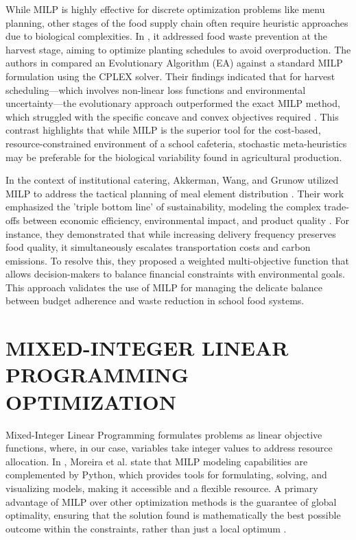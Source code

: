 \documentclass[journal]{IEEEtran}
\begin{document}
While MILP is highly effective for discrete optimization problems like menu planning, other stages of the food supply chain often require heuristic approaches due to biological complexities. In \cite{gunder}, it addressed food waste prevention at the harvest stage, aiming to optimize planting schedules to avoid overproduction. The authors in \cite{gunder} compared an Evolutionary Algorithm (EA) against a standard MILP formulation using the CPLEX solver. Their findings indicated that for harvest scheduling—which involves non-linear loss functions and environmental uncertainty—the evolutionary approach outperformed the exact MILP method, which struggled with the specific concave and convex objectives required \cite{gunder}. This contrast highlights that while MILP is the superior tool for the cost-based, resource-constrained environment of a school cafeteria, stochastic meta-heuristics may be preferable for the biological variability found in agricultural production.

In the context of institutional catering, Akkerman, Wang, and Grunow utilized MILP to address the tactical planning of meal element distribution \cite{akkerman}. Their work emphasized the 'triple bottom line' of sustainability, modeling the complex trade-offs between economic efficiency, environmental impact, and product quality \cite{akkerman}. For instance, they demonstrated that while increasing delivery frequency preserves food quality, it simultaneously escalates transportation costs and carbon emissions. To resolve this, they proposed a weighted multi-objective function that allows decision-makers to balance financial constraints with environmental goals. This approach validates the use of MILP for managing the delicate balance between budget adherence and waste reduction in school food systems.


\section{MIXED-INTEGER LINEAR PROGRAMMING OPTIMIZATION}

Mixed-Integer Linear Programming formulates problems as linear objective functions, where, in our case, variables take integer values to address resource allocation. In \cite{py_milp}, Moreira et al. state that MILP modeling capabilities are complemented by Python, which provides tools for formulating, solving, and visualizing models, making it accessible and a flexible resource. A primary advantage of MILP over other optimization methods is the guarantee of global optimality, ensuring that the solution found is mathematically the best possible outcome within the constraints, rather than just a local optimum \cite{urbanucci} \cite{abbasi}.
\end{document}
